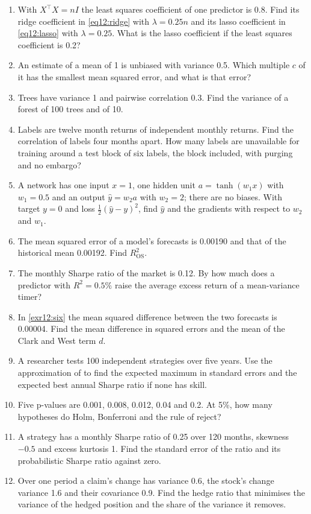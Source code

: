 \begin{chapterrefs}
\begin{enumerate}[label=\textbf{12.\arabic*}, ref=12.\arabic*, leftmargin=*]
  \item\label{exr12:one} With $X^\top X=nI$ the least squares coefficient of one predictor is 0.8. Find its
  ridge coefficient in \cref{eq12:ridge} with $\lambda=0.25n$ and its lasso coefficient in \cref{eq12:lasso}
  with $\lambda=0.25$. What is the lasso coefficient if the least squares coefficient is 0.2?
  \item\label{exr12:two} An estimate of a mean of 1 is unbiased with variance 0.5. Which multiple $c$ of it has
  the smallest mean squared error, and what is that error?
  \item\label{exr12:three} Trees have variance 1 and pairwise correlation 0.3. Find the variance of a forest
  of 100 trees and of 10.
  \item\label{exr12:four} Labels are twelve month returns of independent monthly returns. Find the
  correlation of labels four months apart. How many labels are unavailable for training around a test block of
  six labels, the block included, with purging and no embargo?
  \item\label{exr12:five} A network has one input $x=1$, one hidden unit $a=\tanh(w_1x)$ with $w_1=0.5$ and an
  output $\hat y=w_2a$ with $w_2=2$; there are no biases. With target $y=0$ and loss
  $\tfrac12(\hat y-y)^2$, find $\hat y$ and the gradients with respect to $w_2$ and $w_1$.
  \item\label{exr12:six} The mean squared error of a model's forecasts is 0.00190 and that of the historical
  mean 0.00192. Find $R^2_{\mathrm{OS}}$.
  \item\label{exr12:seven} The monthly Sharpe ratio of the market is 0.12. By how much does a predictor
  with $R^2=0.5\%$ raise the average excess return of a mean-variance timer?
  \item\label{exr12:eight} In \cref{exr12:six} the mean squared difference between the two forecasts is
  0.00004. Find the mean difference in squared errors and the mean of the Clark and West term $d$.
  \item\label{exr12:nine} A researcher tests 100 independent strategies over five years. Use the
  approximation of \textcite{bailey2014} to find the expected maximum in standard errors and the expected best
  annual Sharpe ratio if none has skill.
  \item\label{exr12:ten} Five p-values are 0.001, 0.008, 0.012, 0.04 and 0.2. At 5\%, how many hypotheses do
  Holm, Bonferroni and the rule of \textcite{benjamini1995} reject?
  \item\label{exr12:eleven} A strategy has a monthly Sharpe ratio of 0.25 over 120 months, skewness $-0.5$
  and excess kurtosis 1. Find the standard error of the ratio and its probabilistic Sharpe ratio against zero.
  \item\label{exr12:twelve} Over one period a claim's change has variance 0.6, the stock's change variance 1.6
  and their covariance 0.9. Find the hedge ratio that minimises the variance of the hedged position and the
  share of the variance it removes.
\end{enumerate}


\end{chapterrefs}
